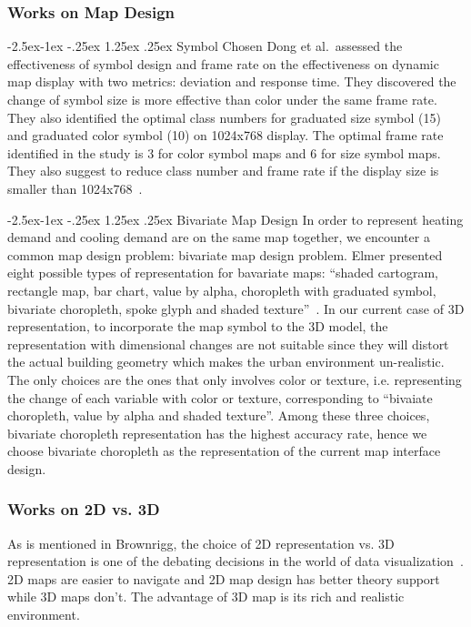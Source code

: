 \documentclass[hidelinks,12pt]{article}
\makeatletter
\renewcommand\paragraph{\@startsection{paragraph}{4}{\z@}%
            {-2.5ex\@plus -1ex \@minus -.25ex}%
            {1.25ex \@plus .25ex}%
            {\normalfont\normalsize\bfseries}}
\makeatother
\begin{document}
\subsubsection{Works on Map Design}\label{mapDesign}
\paragraph{Symbol Chosen}
Dong et al.\ assessed the effectiveness of symbol design and frame
rate on the effectiveness on dynamic map display with two metrics:
deviation and response time. They discovered the change of symbol size
is more effective than color under the same frame rate. They also
identified the optimal class numbers for graduated size symbol (15)
and graduated color symbol (10) on 1024x768 display. The optimal frame
rate identified in the study is 3 for color symbol maps and 6 for size
symbol maps. They also suggest to reduce class number and frame rate
if the display size is smaller than
1024x768~\cite{doi:10.1559/1523040639298}.

\paragraph{Bivariate Map Design} \label{bivariate}
In order to represent heating demand and cooling demand are on the
same map together, we encounter a common map design problem: bivariate
map design problem. Elmer presented eight possible types of
representation for bavariate maps: ``shaded cartogram, rectangle map,
bar chart, value by alpha, choropleth with graduated symbol, bivariate
choropleth, spoke glyph and shaded texture''~\cite{Elmer2012}. In our
current case of 3D representation, to incorporate the map symbol to
the 3D model, the representation with dimensional changes are not
suitable since they will distort the actual building geometry which
makes the urban environment un-realistic. The only choices are the
ones that only involves color or texture, i.e. representing the change
of each variable with color or texture, corresponding to ``bivaiate
choropleth, value by alpha and shaded texture''. Among these three
choices, bivariate choropleth representation has the highest accuracy
rate, hence we choose bivariate choropleth as the representation of
the current map interface design.

\subsubsection{Works on 2D vs. 3D} \label{2d3d} As is mentioned in
Brownrigg, the choice of 2D representation vs. 3D representation is
one of the debating decisions in the world of data
visualization~\cite{Brownrigg2005}. 2D maps are easier to navigate and
2D map design has better theory support while 3D maps don't. The
advantage of 3D map is its rich and realistic environment.
\end{document}
